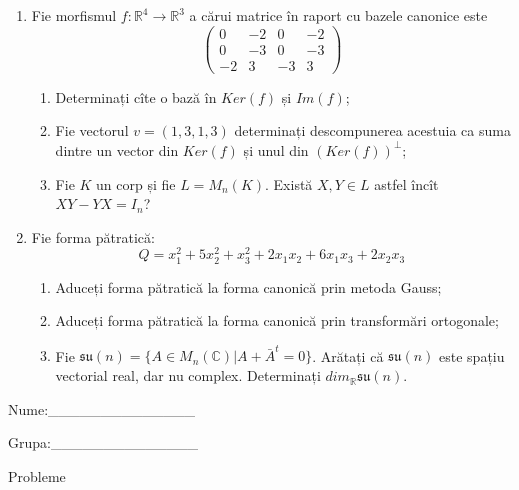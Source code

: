 \documentclass{article}
\begin{document}
\begin{enumerate}
 \item Fie morfismul $f:\mathbb{R}^4 \to \mathbb{R}^3$ a cărui matrice în raport cu bazele canonice este
$$\begin{pmatrix}
0&-2&0&-2\\
0&-3&0&-3\\
-2&3&-3&3
\end{pmatrix}$$

\begin{enumerate}
\item Determinați cîte o bază în $Ker(f)$ și $Im(f)$;
\item Fie vectorul $v=(1,3,1,3)$ determinați descompunerea acestuia ca suma dintre un vector din $Ker(f)$ și unul din $(Ker(f))^\perp$;
\item Fie $K$ un corp și fie $L=M_n(K)$. Există $X,Y \in L$ astfel încît $XY-YX=I_n$?  
\end{enumerate}
\item Fie forma pătratică:
$$Q= x_1^2+5x_2^2+x_3^2+2x_1x_2+6x_1x_3+2x_2x_3$$

\begin{enumerate}
\item Aduceți forma pătratică la forma canonică prin metoda Gauss;
\item Aduceți forma pătratică la forma canonică prin transformări ortogonale;
\item Fie $\mathfrak{su}(n)=\{ A \in M_n(\mathbb{C}) | A+\bar{A}^t=0\}$. Arătați că $\mathfrak{su}(n)$ este spațiu vectorial real, dar nu complex.
Determinați $dim_{\mathbb{R}}\mathfrak{su}(n)$.
\end{enumerate}
\end{enumerate}
\newpage
\begin{flushright}
Nume:\_\_\_\_\_\_\_\_\_\_\_\_\_\_
 
 
Grupa:\_\_\_\_\_\_\_\_\_\_\_\_\_\_
\end{flushright}
\begin{center}
\vspace{2cm}
{\Large Probleme}
\vspace{2cm}
\end{center}
\end{document}
